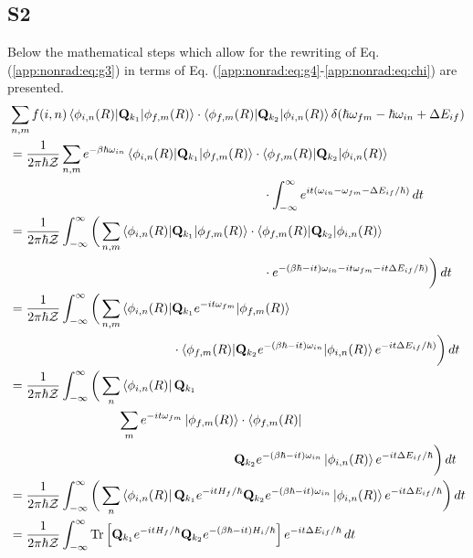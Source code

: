 \subsection{S2}
Below the mathematical steps which allow for the rewriting of Eq. (\ref{app:nonrad:eq:g3}) in terms of Eq. (\ref{app:nonrad:eq:g4}-\ref{app:nonrad:eq:chi}) are presented.
\begin{align}
    &\sum_{n,m} f(i,n) \braket{\phi_{i,n}(R)|
    \mathbf{Q}_{k_1}|\phi_{f,m}(R)} \cdot
    \braket{\phi_{f,m}(R)|\mathbf{Q}_{k_2}|\phi_{i,n}(R)}
    \delta(\hbar\omega_{fm}-\hbar\omega_{in}+\Delta E_{if}) \nonumber \\
    &= \frac{1}{2\pi \hbar\mathcal{Z}} \sum_{n,m} e^{-\beta \hbar\omega_{in}} \braket{\phi_{i,n}(R)|
    \mathbf{Q}_{k_1}|\phi_{f,m}(R)} \cdot
    \braket{\phi_{f,m}(R)|\mathbf{Q}_{k_2}|\phi_{i,n}(R)} \nonumber \\
    &\hspace{7cm}\cdot \int_{-\infty}^{\infty}
    e^{it(\omega_{in}-\omega_{fm}-\Delta E_{if}/\hbar)} \,dt\nonumber \\
    &= \frac{1}{2\pi \hbar\mathcal{Z}} \int_{-\infty}^{\infty} \bigg(\sum_{n,m} \braket{\phi_{i,n}(R)|
    \mathbf{Q}_{k_1}|\phi_{f,m}(R)} \cdot
    \braket{\phi_{f,m}(R)|\mathbf{Q}_{k_2}|\phi_{i,n}(R)} \nonumber \\
    &\hspace{7cm}\cdot
    e^{-(\beta\hbar-it)\omega_{in}-it\omega_{fm}-it\Delta E_{if}/\hbar)} \bigg) \,dt\nonumber \\
    &= \frac{1}{2\pi \hbar\mathcal{Z}} \int_{-\infty}^{\infty} \bigg(\sum_{n,m} \braket{\phi_{i,n}(R)|\mathbf{Q}_{k_1}e^{-it\omega_{fm}}|\phi_{f,m}(R)} \nonumber \\
    &\hspace{4.5cm} \cdot    \braket{\phi_{f,m}(R)|\mathbf{Q}_{k_2}e^{-(\beta\hbar-it)\omega_{in}}|\phi_{i,n}(R)}    e^{-it\Delta E_{if}/\hbar)} \bigg) \,dt\nonumber \\
    &= \frac{1}{2\pi \hbar\mathcal{Z}} \int_{-\infty}^{\infty} \bigg(\sum_{n} \bra{\phi_{i,n}(R)}\mathbf{Q}_{k_1} \nonumber \\
    &\hspace{3cm}\sum_m e^{-it \omega_{fm}}\ket{\phi_{f,m}(R)} \cdot    \bra{\phi_{f,m}(R)} \nonumber \\
    & \hspace{6.2cm} \mathbf{Q}_{k_2}e^{-(\beta\hbar-it)\omega_{in}}\ket{\phi_{i,n}(R)}    e^{-it\Delta E_{if}/\hbar} \bigg) \, dt \nonumber \\
    &= \frac{1}{2\pi \hbar\mathcal{Z}} \int_{-\infty}^{\infty} \bigg(\sum_{n} \bra{\phi_{i,n}(R)}\mathbf{Q}_{k_1} e^{-it H_{f}/\hbar} \mathbf{Q}_{k_2}e^{-(\beta\hbar-it)\omega_{in}}\ket{\phi_{i,n}(R)}    e^{-it\Delta E_{if}/\hbar} \bigg) \, dt \nonumber \\
    &= \frac{1}{2\pi \hbar\mathcal{Z}} \int_{-\infty}^{\infty} \text{Tr} \left[ \mathbf{Q}_{k_1} e^{-it H_{f}/\hbar}
    \mathbf{Q}_{k_2}e^{-(\beta\hbar-it)H_{i}/\hbar} \right]
    e^{-it\Delta E_{if}/\hbar} \, dt
\end{align}
